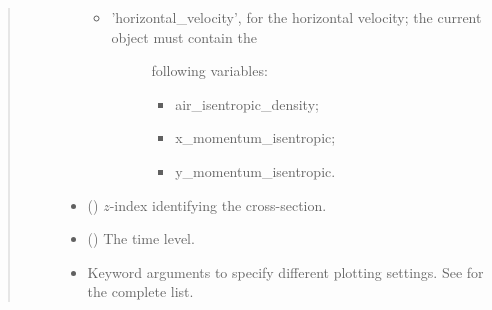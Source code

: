 \documentclass[letterpaper,10pt,english]{sphinxmanual}
\begin{document}
\begin{fulllineitems}
\begin{fulllineitems}
\begin{quote}
\begin{description}
\begin{itemize}
\begin{itemize}
\item {} \begin{description}
\item[{’horizontal\_velocity’, for the horizontal velocity; the current object must contain the}] \leavevmode
following variables:
\begin{itemize}
\item {} 
air\_isentropic\_density;

\item {} 
x\_momentum\_isentropic;

\item {} 
y\_momentum\_isentropic.

\end{itemize}

\end{description}

\end{itemize}


\item {} 
 () \textendash{} \(z\)-index identifying the cross-section.

\item {} 
 () \textendash{} The time level.

\item {} 
 \textendash{} Keyword arguments to specify different plotting settings.
See {\hyperref[\detokenize{api:tasmania.utils.utils_plot.contourf_xy}]{}} for the complete list.

\end{itemize}

\end{description}\end{quote}

\end{fulllineitems}



\end{fulllineitems}
\end{document}
